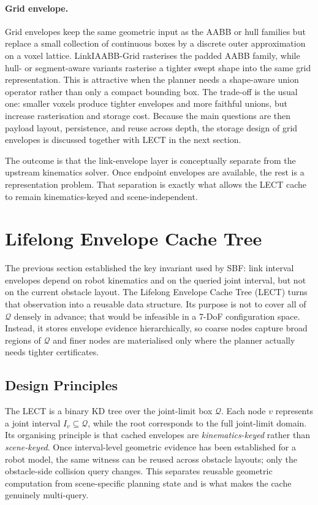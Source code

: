 \documentclass[journal]{IEEEtran}
\DeclareRobustCommand{\textsc}[1]{\textnormal{\MakeUppercase{#1}}}
\newcommand{\sbf}{\textsc{SBF}}
\newcommand{\Q}{\ensuremath{\mathcal{Q}}}
\begin{document}
\paragraph{Grid envelope.}
Grid envelopes keep the same geometric input as the AABB or hull families but
replace a small collection of continuous boxes by a discrete outer
approximation on a voxel lattice. LinkIAABB-Grid rasterises the padded AABB
family, while hull- or segment-aware variants rasterise a tighter swept shape
into the same grid representation. This is attractive when the planner needs a
shape-aware union operator rather than only a compact bounding box. The
trade-off is the usual one: smaller voxels produce tighter envelopes and more
faithful unions, but increase rasterisation and storage cost. Because the main
questions are then payload layout, persistence, and reuse across depth, the
storage design of grid envelopes is discussed together with LECT in the next
section.

The outcome is that the link-envelope layer is conceptually separate from the
upstream kinematics solver. Once endpoint envelopes are available, the rest is a
representation problem. That separation is exactly what allows the LECT cache to
remain kinematics-keyed and scene-independent.

\section{Lifelong Envelope Cache Tree}\label{sec:lect}

The previous section established the key invariant used by \sbf{}: link
interval envelopes depend on robot kinematics and on the queried joint interval,
but not on the current obstacle layout. The Lifelong Envelope Cache Tree
(LECT) turns that observation into a reusable data structure. Its purpose is
not to cover all of $\Q$ densely in advance; that would be infeasible in a
7-DoF configuration space. Instead, it stores envelope evidence hierarchically,
so coarse nodes capture broad regions of $\Q$ and finer nodes are materialised
only where the planner actually needs tighter certificates.

\subsection{Design Principles}\label{sec:lect_design}

The LECT is a binary KD tree over the joint-limit box $\Q$. Each node $v$
represents a joint interval $I_v \subseteq \Q$, while the root corresponds to
the full joint-limit domain. Its organising principle is that cached envelopes
are \emph{kinematics-keyed} rather than \emph{scene-keyed}. Once interval-level
geometric evidence has been established for a robot model, the same witness can
be reused across obstacle layouts; only the obstacle-side collision query
changes. This separates reusable geometric computation from scene-specific
planning state and is what makes the cache genuinely multi-query.
\end{document}
